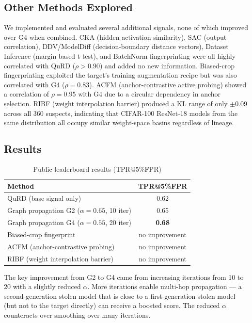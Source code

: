 \documentclass{article} %
\begin{document}
\subsection{Other Methods Explored}

We implemented and evaluated several additional signals, none of which improved over G4 when combined. CKA (hidden activation similarity), SAC (output correlation), DDV/ModelDiff (decision-boundary distance vectors), Dataset Inference (margin-based t-test), and BatchNorm fingerprinting were all highly correlated with QuRD ($\rho > 0.90$) and added no new information. Biased-crop fingerprinting exploited the target's training augmentation recipe but was also correlated with G4 ($\rho = 0.83$). ACFM (anchor-contrastive active probing) showed a correlation of $\rho = 0.95$ with G4 due to a circular dependency in anchor selection. RIBF (weight interpolation barrier) produced a KL range of only $\pm 0.09$ across all 360 suspects, indicating that CIFAR-100 ResNet-18 models from the same distribution all occupy similar weight-space basins regardless of lineage.

\subsection{Results}

\begin{table}[h]
\caption{Public leaderboard results (TPR@5\%FPR)}
\label{results-table}
\begin{center}
\begin{tabular}{lc}
\toprule
\textbf{Method} & \textbf{TPR@5\%FPR} \\
\midrule
QuRD (base signal only)              & 0.62 \\
Graph propagation G2 ($\alpha{=}0.65$, 10 iter) & 0.65 \\
Graph propagation G4 ($\alpha{=}0.55$, 20 iter) & \textbf{0.68} \\
Biased-crop fingerprint              & no improvement \\
ACFM (anchor-contrastive probing)    & no improvement \\
RIBF (weight interpolation barrier)  & no improvement \\
\bottomrule
\end{tabular}
\end{center}
\end{table}

The key improvement from G2 to G4 came from increasing iterations from 10 to 20 with a slightly reduced $\alpha$. More iterations enable multi-hop propagation — a second-generation stolen model that is close to a first-generation stolen model (but not to the target directly) can receive a boosted score. The reduced $\alpha$ counteracts over-smoothing over many iterations.
\end{document}

